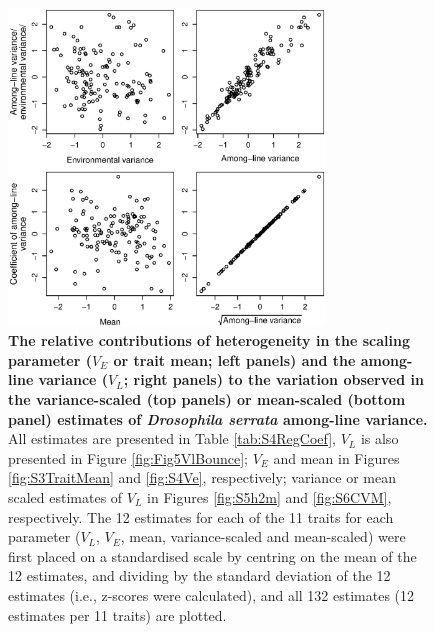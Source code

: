 \begin{figure}
    \centering
    \includegraphics[width=0.75\textwidth]{Supp/Chp2_Meta/S7.Rel.Contribution.eps}
    \caption[The relative contributions of heterogeneity in the scaling parameter ($V_E$ or trait mean) and the among-line variance ($V_L$) to the variation observed in the variance-scaled or mean-scaled estimates of \textit{Drosophila serrata} among-line variance.]{\textbf{The relative contributions of heterogeneity in the scaling parameter ($V_E$ or trait mean; left panels) and the among-line variance ($V_L$; right panels) to the variation observed in the variance-scaled (top panels) or mean-scaled (bottom panel) estimates of \textit{Drosophila serrata} among-line variance.} All estimates are presented in Table \ref{tab:S4RegCoef}, $V_L$ is also presented in Figure \ref{fig:Fig5VlBounce}; $V_E$ and mean in Figures \ref{fig:S3TraitMean} and \ref{fig:S4Ve}, respectively; variance or mean scaled estimates of $V_L$ in Figures \ref{fig:S5h2m} and \ref{fig:S6CVM}, respectively. The 12 estimates for each of the 11 traits for each parameter ($V_L$, $V_E$, mean, variance-scaled and mean-scaled) were first placed on a standardised scale by centring on the mean of the 12 estimates, and dividing by the standard deviation of the 12 estimates (i.e., z-scores were calculated), and all 132 estimates (12 estimates per 11 traits) are plotted.}
    \label{fig:S7Heterogenity}
\end{figure}

